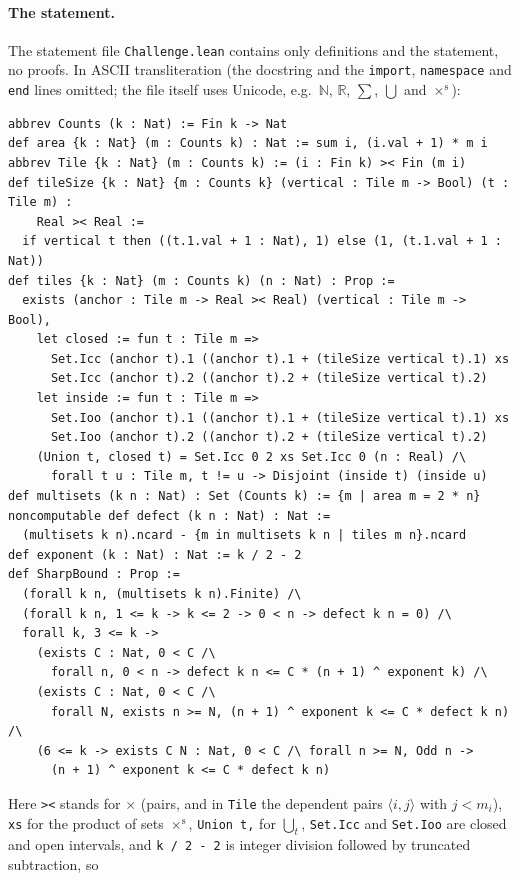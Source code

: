 \documentclass[11pt]{article}
\theoremstyle{definition}
\theoremstyle{remark}
\begin{document}
{\paragraph{The statement.}
The statement file \texttt{Challenge.lean} contains only definitions and the
statement, no proofs. In ASCII transliteration (the docstring and the
\texttt{import}, \texttt{namespace} and \texttt{end} lines omitted; the file
itself uses Unicode, e.g.\ $\mathbb N$, $\mathbb R$, $\sum$, $\bigcup$ and
$\times^{\mathrm s}$):
{\footnotesize
\begin{verbatim}
abbrev Counts (k : Nat) := Fin k -> Nat
def area {k : Nat} (m : Counts k) : Nat := sum i, (i.val + 1) * m i
abbrev Tile {k : Nat} (m : Counts k) := (i : Fin k) >< Fin (m i)
def tileSize {k : Nat} {m : Counts k} (vertical : Tile m -> Bool) (t : Tile m) :
    Real >< Real :=
  if vertical t then ((t.1.val + 1 : Nat), 1) else (1, (t.1.val + 1 : Nat))
def tiles {k : Nat} (m : Counts k) (n : Nat) : Prop :=
  exists (anchor : Tile m -> Real >< Real) (vertical : Tile m -> Bool),
    let closed := fun t : Tile m =>
      Set.Icc (anchor t).1 ((anchor t).1 + (tileSize vertical t).1) xs
      Set.Icc (anchor t).2 ((anchor t).2 + (tileSize vertical t).2)
    let inside := fun t : Tile m =>
      Set.Ioo (anchor t).1 ((anchor t).1 + (tileSize vertical t).1) xs
      Set.Ioo (anchor t).2 ((anchor t).2 + (tileSize vertical t).2)
    (Union t, closed t) = Set.Icc 0 2 xs Set.Icc 0 (n : Real) /\
      forall t u : Tile m, t != u -> Disjoint (inside t) (inside u)
def multisets (k n : Nat) : Set (Counts k) := {m | area m = 2 * n}
noncomputable def defect (k n : Nat) : Nat :=
  (multisets k n).ncard - {m in multisets k n | tiles m n}.ncard
def exponent (k : Nat) : Nat := k / 2 - 2
def SharpBound : Prop :=
  (forall k n, (multisets k n).Finite) /\
  (forall k n, 1 <= k -> k <= 2 -> 0 < n -> defect k n = 0) /\
  forall k, 3 <= k ->
    (exists C : Nat, 0 < C /\
      forall n, 0 < n -> defect k n <= C * (n + 1) ^ exponent k) /\
    (exists C : Nat, 0 < C /\
      forall N, exists n >= N, (n + 1) ^ exponent k <= C * defect k n) /\
    (6 <= k -> exists C N : Nat, 0 < C /\ forall n >= N, Odd n ->
      (n + 1) ^ exponent k <= C * defect k n)
\end{verbatim}}
\noindent Here \texttt{><} stands for $\times$ (pairs, and in \texttt{Tile}
the dependent pairs $\langle i,j\rangle$ with $j<m_i$), \texttt{xs} for the
product of sets $\times^{\mathrm s}$, \texttt{Union t,} for $\bigcup_t$,
\texttt{Set.Icc} and \texttt{Set.Ioo} are closed and open intervals, and
\texttt{k / 2 - 2} is integer division followed by truncated subtraction, so
}
\end{document}
